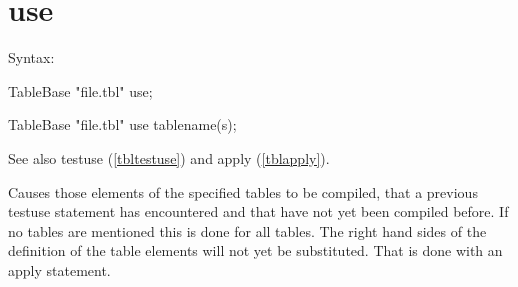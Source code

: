 \section{use}
\label{tbluse}

\noindent Syntax:

TableBase "file.tbl" use;

TableBase "file.tbl" use tablename(s);

\noindent See also testuse (\ref{tbltestuse}) and apply (\ref{tblapply}).

\noindent Causes those elements of the specified tables to be 
compiled, that a previous testuse statement has encountered 
and that have not yet been compiled before. If no tables are mentioned this 
is done for all tables. The right hand sides of the definition of the table 
elements will not yet be substituted. That is done with an 
apply statement.


